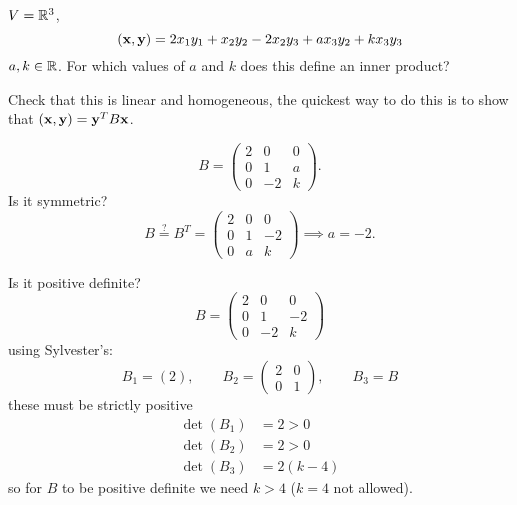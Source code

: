 \documentclass[10pt, a4paper]{article}
\begin{document}
\begin{problem}
    $V = \mathbb{R} ^ 3$,
    \[
    (\mathbf{x}, \mathbf{y}) = 2x_1y_1 + x_2y_2 - 2x_2y_3 + ax_3y_2 + kx_3y_3
    \]
    $a, k \in \mathbb{R}$.
    For which values of $a$ and $k$ does this define an inner product?

    \begin{solution}
        Check that this is linear and homogeneous,
        the quickest way to do this is to show that $(\mathbf{x}, \mathbf{y}) = \mathbf{y} ^ TB\mathbf{x}$.

        \[
        B = \begin{pmatrix}
            2 & 0 & 0 \\
            0 & 1 & a \\
            0 & -2 & k
        \end{pmatrix}.
        \]
        Is it symmetric?
        \[
        B \overset{?}{=} B ^ T = \begin{pmatrix}
            2 & 0 & 0 \\
            0 & 1 & -2 \\
            0 & a & k
        \end{pmatrix} \implies a = -2.
        \]

        Is it positive definite?
        \[
        B = \begin{pmatrix}
            2 & 0 & 0 \\
            0 & 1 & -2 \\
            0 & -2 & k
        \end{pmatrix}
        \]
        using Sylvester's:
        \[
        B_1 = (2),\qquad B_2 = \begin{pmatrix}
            2 & 0 \\ 0 & 1
        \end{pmatrix},\qquad B_3 = B
        \]
        these must be strictly positive
        \begin{align*}
            \det(B_1) &= 2 > 0 \\
            \det(B_2) &= 2 > 0 \\
            \det(B_3) &= 2(k - 4)
        \end{align*}
        so for $B$ to be positive definite we need $k > 4$
        ($k = 4$ not allowed).
        

\end{solution}
\end{problem}
\end{document}
